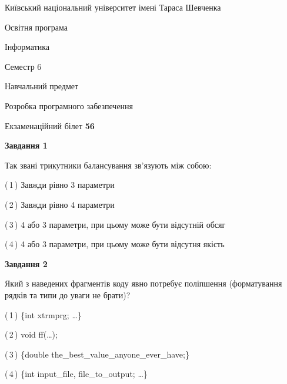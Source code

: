 \documentclass[10pt, ukrainian]{article}
\begin{document}
{{\begin {small}\par
{ \center  Київський національний університет імені Тараса Шевченка \par}
{\parbox {5 cm}{Освітня програма \hfill}{\parbox {7 cm}{Інформатика \hfill}}\parbox {6 cm}{\hfill Семестр 6}}\par
{\parbox {5 cm} {Навчальний предмет \hfill}\parbox {7 cm}{Розробка програмного забезпечення \hfill}\parbox {6cm}{\hfill}\par}\vspace{-7pt} \end{small}}{\center Екзаменаційний білет \No \textbf
{ 56 }\par}}
{
\begin {large}
{\begin {center}\textbf{Завдання 1}\end {center}}\par
Так звані трикутники балансування зв'язують між собою:\par
\vspace{2mm}



(\,1\,) Завжди рівно 3 параметри%



(\,2\,) Завжди рівно 4 параметри%



(\,3\,) 4 або 3 параметри, при цьому може бути відсутній обсяг %



(\,4\,) 4 або 3 параметри, при цьому може бути відсутня якість%


{\begin {center}\textbf{Завдання 2}\end {center}}\par
Який з наведених фрагментів коду явно потребує поліпшення (форматування рядків та типи до уваги не брати)?\par
\vspace{2mm}



(\,1\,) \{int xtrmprg; …\}%



(\,2\,) void ff(…);%



(\,3\,) \{double the\_best\_value\_anyone\_ever\_have;\} %



(\,4\,) \{int input\_file, file\_to\_output; …\}%



\end{large}}
\end{document}
